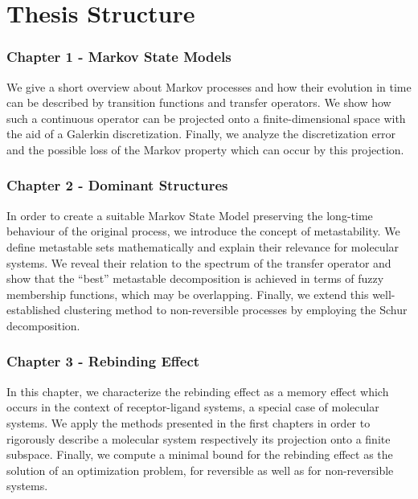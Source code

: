\section*{Thesis Structure}

\subsubsection*{Chapter 1 - Markov State Models}
We give a short overview about Markov processes and how their evolution in time can be described by transition functions and transfer operators. %
We show how such a continuous operator can be projected onto a finite-dimensional space with the aid of a Galerkin discretization.
Finally, we analyze the discretization error and the possible loss of the Markov property which can occur by this projection.

\subsubsection*{Chapter 2 - Dominant Structures}
In order to create a suitable Markov State Model preserving the long-time behaviour of the original process, we introduce the concept of metastability.
We define metastable sets mathematically and explain their relevance for molecular systems.
We reveal their relation to the spectrum of the transfer operator and show that the ``best'' metastable decomposition is achieved in terms of fuzzy membership functions, which may be overlapping.
Finally, we extend this well-established clustering method to non-reversible processes by employing the Schur decomposition. %

\subsubsection*{Chapter 3 - Rebinding Effect}
In this chapter, we characterize the rebinding effect as a memory effect which occurs in the context of receptor-ligand systems, a special case of molecular systems. %
We apply the methods presented in the first chapters in order to rigorously describe a molecular system respectively its projection onto a finite subspace.
Finally, we compute a minimal bound for the rebinding effect as the solution of an optimization problem, for reversible as well as for non-reversible systems.

